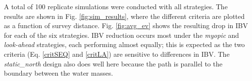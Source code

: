 A total of 100 replicate simulations were conducted with all
strategies. The results are shown in Fig. \ref{fig:sim_results}, where
the different criteria are plotted as a function of survey
distance. Fig. \ref{fig:avg_ev} shows the resulting drop in IBV for
each of the six strategies. IBV reduction occurs most under the
\textit{myopic} and \textit{look-ahead} strategies, each performing
almost equally; this is expected as the two criteria
(Eq. \eqref{critSEQ} and \eqref{critLA}) are sensitive to differences
in IBV. The \textit{static\_north} design also does well here because
the path is parallel to the boundary between the water masses.

\begin{figure}[h!]
  \centering
  \hfill
  \hfill 

\end{figure}
